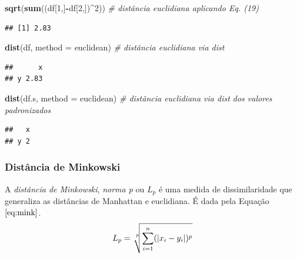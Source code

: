 \documentclass[
]{book}
\newenvironment{Shaded}{\begin{snugshade}}{\end{snugshade}}
\newcommand{\CommentTok}[1]{\textcolor[rgb]{0.56,0.35,0.01}{\textit{#1}}}
\newcommand{\DataTypeTok}[1]{\textcolor[rgb]{0.13,0.29,0.53}{#1}}
\newcommand{\DecValTok}[1]{\textcolor[rgb]{0.00,0.00,0.81}{#1}}
\newcommand{\KeywordTok}[1]{\textcolor[rgb]{0.13,0.29,0.53}{\textbf{#1}}}
\newcommand{\NormalTok}[1]{#1}
\newcommand{\OperatorTok}[1]{\textcolor[rgb]{0.81,0.36,0.00}{\textbf{#1}}}
\newcommand{\StringTok}[1]{\textcolor[rgb]{0.31,0.60,0.02}{#1}}
\theoremstyle{definition}
\theoremstyle{definition}
\theoremstyle{definition}
\theoremstyle{remark}
\begin{document}
\begin{Shaded}
\begin{Highlighting}[]
\KeywordTok{sqrt}\NormalTok{(}\KeywordTok{sum}\NormalTok{((df[}\DecValTok{1}\NormalTok{,]}\OperatorTok{{-}}\NormalTok{df[}\DecValTok{2}\NormalTok{,])}\OperatorTok{\^{}}\DecValTok{2}\NormalTok{))  }\CommentTok{\# distância euclidiana aplicando Eq. (19)}
\end{Highlighting}
\end{Shaded}

\begin{verbatim}
## [1] 2.83
\end{verbatim}

\begin{Shaded}
\begin{Highlighting}[]
\KeywordTok{dist}\NormalTok{(df, }\DataTypeTok{method =} \StringTok{\textquotesingle{}euclidean\textquotesingle{}}\NormalTok{)  }\CommentTok{\# distância euclidiana via \textquotesingle{}dist\textquotesingle{}}
\end{Highlighting}
\end{Shaded}

\begin{verbatim}
##      x
## y 2.83
\end{verbatim}

\begin{Shaded}
\begin{Highlighting}[]
\KeywordTok{dist}\NormalTok{(df.s, }\DataTypeTok{method =} \StringTok{\textquotesingle{}euclidean\textquotesingle{}}\NormalTok{)  }\CommentTok{\# distância euclidiana via \textquotesingle{}dist\textquotesingle{} dos valores padronizados}
\end{Highlighting}
\end{Shaded}

\begin{verbatim}
##   x
## y 2
\end{verbatim}

\hypertarget{distuxe2ncia-de-minkowski}{%
\subsubsection*{Distância de Minkowski}\label{distuxe2ncia-de-minkowski}}

A \emph{distância de Minkowski}, \emph{norma p} ou \(L_p\) é uma medida de dissimilaridade que generaliza as distâncias de Manhattan e euclidiana. É dada pela Equação \(\eqref{eq:mink}\).
\begin{equation}
L_p = \sqrt[\leftroot{-2}\uproot{3}p]{\sum_{i=1}^{n} (|x_i - y_i|)^p}
\label{eq:mink}
\end{equation}
\end{document}
